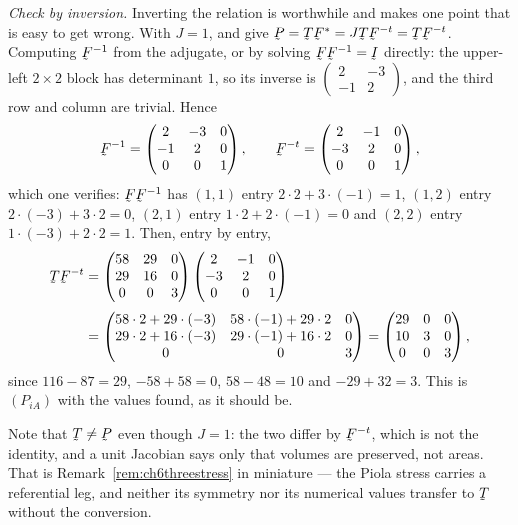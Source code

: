 \begin{solution}
\medskip
\noindent\emph{Check by inversion.}
Inverting the relation is worthwhile and makes one point that is easy
to get wrong. With $J=1$,  and  give
$\bP=\bT\bF^{*}=J\bT\bF^{-t}=\bT\bF^{-t}$. Computing $\bF^{-1}$ from
the adjugate, or by solving $\bF\bF^{-1}=\I$ directly: the upper-left
$2\times2$ block has determinant $1$, so its inverse is
$\begin{pmatrix}2&-3\\-1&2\end{pmatrix}$, and the third row and column
are trivial. Hence
\[
   \bF^{-1}=\begin{pmatrix}2&-3&0\\-1&2&0\\0&0&1\end{pmatrix},
   \qquad
   \bF^{-t}=\begin{pmatrix}2&-1&0\\-3&2&0\\0&0&1\end{pmatrix},
\]
which one verifies:
$\bF\bF^{-1}$ has $(1,1)$ entry $2\cdot2+3\cdot(-1)=1$, $(1,2)$ entry
$2\cdot(-3)+3\cdot2=0$, $(2,1)$ entry $1\cdot2+2\cdot(-1)=0$ and
$(2,2)$ entry $1\cdot(-3)+2\cdot2=1$. Then, entry by entry,
\[
\begin{aligned}
   \bT\bF^{-t}
   &=\begin{pmatrix}58&29&0\\29&16&0\\0&0&3\end{pmatrix}
     \begin{pmatrix}2&-1&0\\-3&2&0\\0&0&1\end{pmatrix}\\[1mm]
   &=\begin{pmatrix}
     58\cdot2+29\cdot(-3) & 58\cdot(-1)+29\cdot2 & 0\\
     29\cdot2+16\cdot(-3) & 29\cdot(-1)+16\cdot2 & 0\\
     0 & 0 & 3\end{pmatrix}
    =\begin{pmatrix}29&0&0\\10&3&0\\0&0&3\end{pmatrix},
\end{aligned}
\]
since $116-87=29$, $-58+58=0$, $58-48=10$ and $-29+32=3$. This is
$(P_{iA})$ with the values found, as it should be.

Note that $\bT\neq\bP$ even though $J=1$: the two differ by
$\bF^{-t}$, which is not the identity, and a unit Jacobian says only
that volumes are preserved, not areas. That is
Remark~\ref{rem:ch6threestress} in miniature --- the Piola stress
carries a referential leg, and neither its symmetry nor its numerical
values transfer to $\bT$ without the conversion.
\end{solution}



